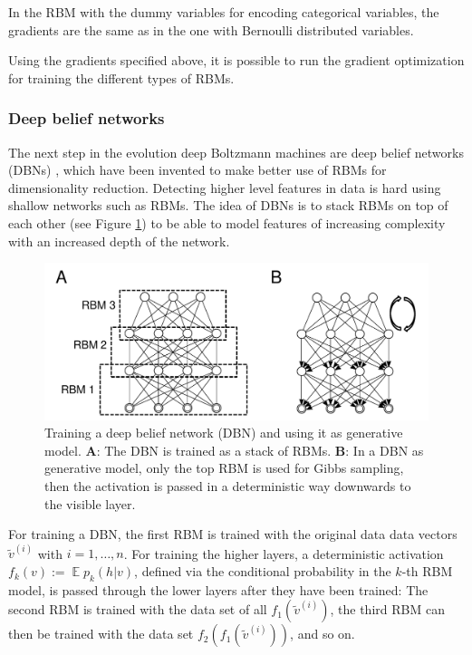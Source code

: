 \documentclass[12pt]{article}
\DeclareMathOperator{\EX}{\mathbb{E}}
\begin{document}
In the RBM with the dummy variables for encoding categorical variables, the gradients are the same as in the one with Bernoulli distributed variables.

Using the gradients specified above, it is possible to run the gradient optimization for training the different types of RBMs.

\subsubsection{Deep belief networks}\label{dbns}

The next step in the evolution deep Boltzmann machines are deep belief networks (DBNs) \citep{hinton_reducing_2006}, which have been invented to make better use of RBMs for dimensionality reduction.
Detecting higher level features in data is hard using shallow networks such as RBMs.
The idea of DBNs is to stack RBMs on top of each other (see Figure \ref{fig:dbn}) to be able to model features of increasing complexity with an increased depth of the network.

\begin{figure}[h]
   \centering
   \includegraphics[scale=0.7]{images/dbn.pdf}
   \caption{Training a deep belief network (DBN) and using it as generative model.
   {\bf A}: The DBN is trained as a stack of RBMs. {\bf B}: In a DBN as generative model, only the top RBM is used for Gibbs sampling, then the activation is passed in a deterministic way downwards to the visible layer.}
   \label{fig:dbn}
 \end{figure}

For training a DBN, the first RBM is trained with the original data data vectors $\tilde{v}^{(i)}$ with $i = 1, \dots, n$.
For training the higher layers, a deterministic activation $f_k(v) :=  \EX p_k(h|v)$, defined via the conditional probability in the $k$-th RBM model, is passed through the lower layers after they have been trained:
The second RBM is trained with the data set of all $f_1(\tilde{v}^{(i)})$, the third RBM can then be trained with the data set $f_2(f_1(\tilde{v}^{(i)}))$, and so on.
\end{document}
